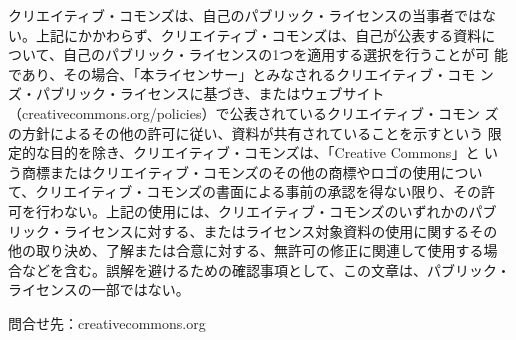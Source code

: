 {クリエイティブ・コモンズは、自己のパブリック・ライセンスの当事者ではな
い。上記にかかわらず、クリエイティブ・コモンズは、自己が公表する資料に
ついて、自己のパブリック・ライセンスの1つを適用する選択を行うことが可
能であり、その場合、「本ライセンサー」とみなされるクリエイティブ・コモ
ンズ・パブリック・ライセンスに基づき、またはウェブサイト
（creativecommons.org/policies）で公表されているクリエイティブ・コモン
ズの方針によるその他の許可に従い、資料が共有されていることを示すという
限定的な目的を除き、クリエイティブ・コモンズは、「Creative Commons」と
いう商標またはクリエイティブ・コモンズのその他の商標やロゴの使用につい
て、クリエイティブ・コモンズの書面による事前の承認を得ない限り、その許
可を行わない。上記の使用には、クリエイティブ・コモンズのいずれかのパブ
リック・ライセンスに対する、またはライセンス対象資料の使用に関するその
他の取り決め、了解または合意に対する、無許可の修正に関連して使用する場
合などを含む。誤解を避けるための確認事項として、この文章は、パブリック・
ライセンスの一部ではない。

問合せ先：creativecommons.org

}





